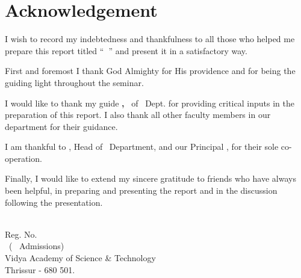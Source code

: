 %
%
%
%
%
%
%
%
\chapter*{Acknowledgement}
%


\par
\hspace{0.9cm}I wish to record my indebtedness and thankfulness 
to all those who helped me prepare this report titled ``{\bf \vtitle\ }''  and present it in a satisfactory way.

\vspace {.2cm}
\par
\hspace{.35cm}First and foremost I thank God Almighty for His providence and for being the guiding light throughout the seminar.

\vspace{0.2cm}
\par
\hspace{0.35cm}I would like to thank my guide {\bf \vguide, } \vguidedg\ of \vdept\  Dept. for providing critical inputs in the preparation of this report. I also thank all other faculty members in our department for their guidance.


\vspace{.2cm}
\par 
\hspace{.35cm}I am thankful to {\bf \vhod}, 
Head of \vdept\  Department, and our Principal {\bf \vprincipal}, for their sole co-operation.



\vspace{0.2cm}
\par
\hspace{0.35cm}Finally, I would like to extend my sincere gratitude to friends who have always been helpful, in preparing and presenting the report and in the discussion following the presentation.

\begin{flushright}
\vauthor\\
Reg. No. \vregisternumber\\
\vclass\  ( \vadmissionyear\  Admissions)\\
Vidya Academy of Science \& Technology\\
Thrissur - 680 501.
\end{flushright}

\vmonth\ 

